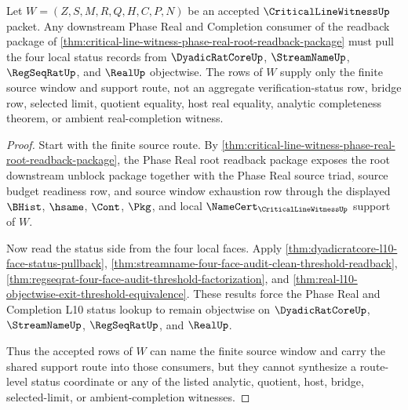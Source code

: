 \begin{theorem}
\label{thm:critical-line-witness-phase-real-l10-face-status-pullback}
Let $W=(Z,S,M,R,Q,H,C,P,N)$ be an accepted $\CriticalLineWitnessUp$ packet. Any downstream Phase Real and Completion consumer of the readback package of \autoref{thm:critical-line-witness-phase-real-root-readback-package} must pull the four local status records from $\DyadicRatCoreUp$, $\StreamNameUp$, $\RegSeqRatUp$, and $\RealUp$ objectwise. The rows of $W$ supply only the finite source window and support route, not an aggregate verification-status row, bridge row, selected limit, quotient equality, host real equality, analytic completeness theorem, or ambient real-completion witness.
\end{theorem}
\begin{proof}
Start with the finite source route. By \autoref{thm:critical-line-witness-phase-real-root-readback-package}, the Phase Real root readback package exposes the root downstream unblock package together with the Phase Real source triad, source budget readiness row, and source window exhaustion row through the displayed $\BHist$, $\hsame$, $\Cont$, $\Pkg$, and local $\NameCert_{\CriticalLineWitnessUp}$ support of $W$.

Now read the status side from the four local faces. Apply \autoref{thm:dyadicratcore-l10-face-status-pullback}, \autoref{thm:streamname-four-face-audit-clean-threshold-readback}, \autoref{thm:regseqrat-four-face-audit-threshold-factorization}, and \autoref{thm:real-l10-objectwise-exit-threshold-equivalence}. These results force the Phase Real and Completion L10 status lookup to remain objectwise on $\DyadicRatCoreUp$, $\StreamNameUp$, $\RegSeqRatUp$, and $\RealUp$.

Thus the accepted rows of $W$ can name the finite source window and carry the shared support route into those consumers, but they cannot synthesize a route-level status coordinate or any of the listed analytic, quotient, host, bridge, selected-limit, or ambient-completion witnesses.
\end{proof}

